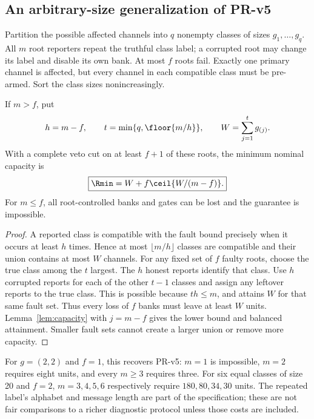 \subsection{An arbitrary-size generalization of PR-v5}
Partition the possible affected channels into $q$ nonempty classes of sizes $g_1,\ldots,g_q$. All $m$ root reporters repeat the truthful class label; a corrupted root may change its label and disable its own bank. At most $f$ roots fail. Exactly one primary channel is affected, but every channel in each compatible class must be pre-armed. Sort the class sizes nonincreasingly.

\begin{theorem}
\label{thm:replicated}
If $m>f$, put
\begin{equation}
 h=m-f,\qquad t=\min\{q,\floor{m/h}\},\qquad W=\sum_{j=1}^{t}g_{(j)}.
\end{equation}
With a complete veto cut on at least $f+1$ of these roots, the minimum nominal capacity is
\begin{equation}
\boxed{\Rmin=W+f\ceil{W/(m-f)}.}
\label{eq:replicated}
\end{equation}
For $m\leq f$, all root-controlled banks and gates can be lost and the guarantee is impossible.
\end{theorem}
\begin{proof}
A reported class is compatible with the fault bound precisely when it occurs at least $h$ times. Hence at most $\lfloor m/h\rfloor$ classes are compatible and their union contains at most $W$ channels. For any fixed set of $f$ faulty roots, choose the true class among the $t$ largest. The $h$ honest reports identify that class. Use $h$ corrupted reports for each of the other $t-1$ classes and assign any leftover reports to the true class. This is possible because $th\leq m$, and attains $W$ for that same fault set. Thus every loss of $f$ banks must leave at least $W$ units. Lemma~\ref{lem:capacity} with $j=m-f$ gives the lower bound and balanced attainment. Smaller fault sets cannot create a larger union or remove more capacity.
\end{proof}
For $g=(2,2)$ and $f=1$, this recovers PR-v5: $m=1$ is impossible, $m=2$ requires eight units, and every $m\geq3$ requires three. For six equal classes of size 20 and $f=2$, $m=3,4,5,6$ respectively require $180,80,34,30$ units. The repeated label's alphabet and message length are part of the specification; these are not fair comparisons to a richer diagnostic protocol unless those costs are included.

